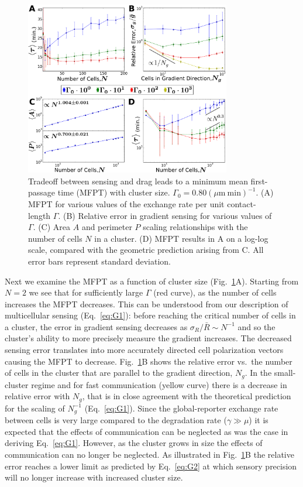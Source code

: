 \begin{figure}[ht]
    \centering
        \includegraphics[width=0.80\textwidth]{../fig/ch4_fig3.png}
    \caption{Tradeoff between sensing and drag leads to a minimum mean first-passage time (MFPT) with cluster size. $\Gamma_0 = 0.80 (\mu\text{m} \ \text{min})^{-1}$. (A) MFPT for various values of the exchange rate per unit contact-length $\Gamma$. (B) Relative error in gradient sensing for various values of $\Gamma$. (C) Area $A$ and perimeter $P$ scaling relationships with the number of cells $N$ in a cluster. (D) MFPT results in A on a log-log scale, compared with the geometric prediction arising from C. All error bars represent standard deviation.} \label{fig:results}
\end{figure}


Next we examine the MFPT as a function of cluster size (Fig.\ \ref{fig:results}A). Starting from $N=2$ we see that for sufficiently large $\Gamma$ (red curve), as the number of cells increases the MFPT decreases. This can be understood from our description of multicellular sensing (Eq.\ \ref{eq:G1}): before reaching the critical number of cells in a cluster, the error in gradient sensing decreases as $\sigma_R/\bar{R} \sim N^{-1}$ and so the cluster's ability to more precisely measure the gradient increases. The decreased sensing error translates into more accurately directed cell polarization vectors causing the MFPT to decrease. Fig.\ \ref{fig:results}B shows the relative error vs.\ the number of cells in the cluster that are parallel to the gradient direction, $N_g$. In the small-cluster regime and for fast communication (yellow curve) there is a decrease in relative error with $N_g$, that is in close agreement with the theoretical prediction for the scaling of $N_g^{-1}$
(Eq.\ \ref{eq:G1}). Since the global-reporter exchange rate between cells is very large compared to the degradation rate
($\gamma\gg\mu$)
it is expected that the effects of communication can be neglected as was the case in deriving Eq.\ \ref{eq:G1}. However, as the cluster grows in size the effects of communication can no longer be neglected. As illustrated in Fig.\ \ref{fig:results}B the relative error reaches a lower limit as predicted by Eq.\ \ref{eq:G2} at which sensory precision will no longer increase with increased cluster size.

